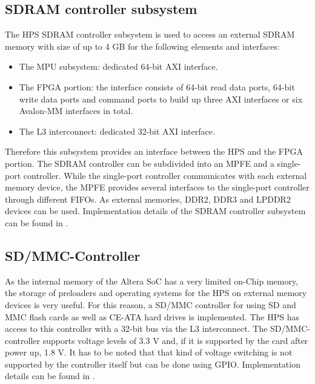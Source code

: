\subsection{SDRAM controller subsystem}
The HPS SDRAM controller subsystem is used to access an external SDRAM memory with size of up to 4 GB for the following elements and interfaces:
\begin{itemize}
\item The MPU subsystem: dedicated 64-bit AXI interface.
\item The FPGA portion: the interface consists of 64-bit read data ports, 64-bit write data ports and command ports to build up three AXI interfaces or six Avalon-MM interfaces in total.
\item The L3 interconnect: dedicated 32-bit AXI interface.
\end{itemize}
Therefore this subsystem provides an interface between the HPS and the FPGA portion. The SDRAM controller can be subdivided into an MPFE and a single-port controller. While the single-port controller communicates with each external memory device, the MPFE provides several interfaces to the single-port controller through different FIFOs. As external memories, DDR2, DDR3 and LPDDR2 devices can be used. Implementation details of the SDRAM controller subsystem can be found in \cite[chapter 11]{AlteraHPS15}.
\subsection{SD/MMC-Controller}
As the internal memory of the Altera SoC has a very limited on-Chip memory, the storage of preloaders and operating systems for the HPS on external memory devices is very useful. For this reason, a SD/MMC controller for using SD and MMC flash cards as well as CE-ATA hard drives is implemented. The HPS has access to this controller with a 32-bit bus via the L3 interconnect. The SD/MMC-controller supports voltage levels of 3.3 V and, if it is supported by the card after power up, 1.8 V. It has to be noted that that kind of voltage switching is not supported by the controller itself but can be done using GPIO. Implementation details can be found in \cite[chapter 14]{AlteraHPS15}.
